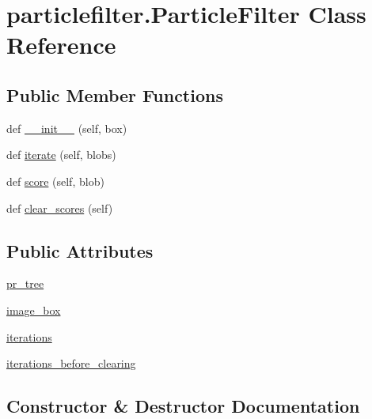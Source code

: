 \hypertarget{classparticlefilter_1_1ParticleFilter}{}\section{particlefilter.\+Particle\+Filter Class Reference}
\label{classparticlefilter_1_1ParticleFilter}
\subsection*{Public Member Functions}
\begin{DoxyCompactItemize}
\item 
def \hyperlink{classparticlefilter_1_1ParticleFilter_a6948f5fd9e23311a5d852d4cee9fcd74}{\+\_\+\+\_\+init\+\_\+\+\_\+} (self, box)
\item 
def \hyperlink{classparticlefilter_1_1ParticleFilter_a712cbf35d447e829bee6eb3511d6ed84}{iterate} (self, blobs)
\item 
def \hyperlink{classparticlefilter_1_1ParticleFilter_a14d4400ba16d6413f279baa8d0aaff2d}{score} (self, blob)
\item 
def \hyperlink{classparticlefilter_1_1ParticleFilter_a23de668d643dfd03ef021b18129be7ec}{clear\+\_\+scores} (self)
\end{DoxyCompactItemize}
\subsection*{Public Attributes}
\begin{DoxyCompactItemize}
\item 
\hyperlink{classparticlefilter_1_1ParticleFilter_ad105183603f7e2a9b31ad9b51a904876}{pr\+\_\+tree}
\item 
\hyperlink{classparticlefilter_1_1ParticleFilter_a057adc68ef8ba14478db6e8a453eca32}{image\+\_\+box}
\item 
\hyperlink{classparticlefilter_1_1ParticleFilter_a6bb442d25bc95fd1174e0f1f65a5b059}{iterations}
\item 
\hyperlink{classparticlefilter_1_1ParticleFilter_a3aee419fa01abd6a08a0b512a79d5123}{iterations\+\_\+before\+\_\+clearing}
\end{DoxyCompactItemize}


\subsection{Constructor \& Destructor Documentation}
\hypertarget{classparticlefilter_1_1ParticleFilter_a6948f5fd9e23311a5d852d4cee9fcd74}{}
